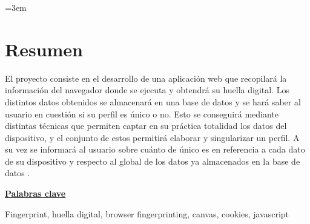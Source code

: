\parindent=3em
\chapter*{Resumen}

El proyecto consiste en el desarrollo de una aplicación web que recopilará la información del navegador donde se ejecuta y obtendrá su huella digital. Los distintos datos obtenidos se almacenará en una base de datos y se hará saber al usuario en cuestión si su perfil es único o no. Esto se conseguirá mediante distintas técnicas que permiten captar en su práctica totalidad los datos del dispositivo, y el conjunto de estos permitirá elaborar y singularizar un perfil. A su vez se informará al usuario sobre cuánto de único es en referencia a cada dato de su dispositivo y respecto al global de los datos ya almacenados en la base de datos . \par
\vspace{12mm}
\noindent
\underline{\Large{\textbf{Palabras clave}}}\par
\vspace{7mm}
\noindent
\normalsize{Fingerprint, huella digital, browser fingerprinting, canvas, cookies, javascript}
